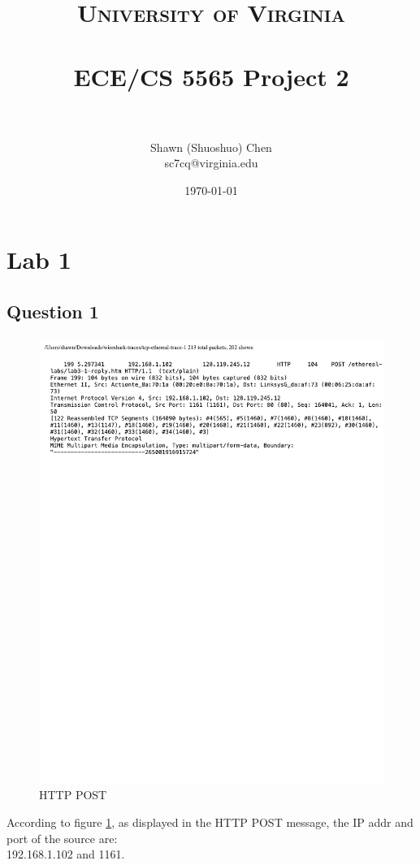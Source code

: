 \documentclass[titlepage, paper=a4, fontsize=11pt]{scrartcl} %
\title{	
\normalfont \normalsize 
\textsc{University of Virginia} \\ [25pt] %
\horrule{0.5pt} \\[0.4cm] %
\huge ECE/CS 5565 Project 2 \\ %
\horrule{2pt} \\[0.5cm] %
}
\author{Shawn (Shuoshuo) Chen\\sc7cq@virginia.edu} %
\date{\normalsize\today} %
\numberwithin{equation}{section} %
\numberwithin{figure}{section} %
\numberwithin{table}{section} %
\begin{document}
\maketitle %


\section*{\textbf{Lab 1}}
\subsection*{Question 1}
\begin{figure}[!ht]
    \centering
    \includegraphics[width=\textwidth]{images/lab1-q1.pdf}
    \caption{HTTP POST}
    \label{fig:http-post}
\end{figure}
According to figure \ref{fig:http-post}, as displayed in the HTTP POST message, the IP addr and port of the source are: \\
192.168.1.102 and 1161. \\
\end{document}
